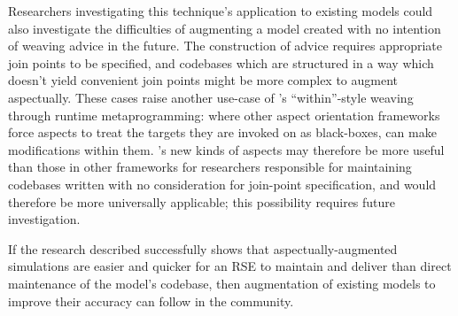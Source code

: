 Researchers investigating this technique's application to existing models could
also investigate the difficulties of augmenting a model created with no
intention of weaving advice in the future. The construction of advice requires
appropriate join points to be specified, and codebases which are structured in a
way which doesn't yield convenient join points might be more complex to augment
aspectually. These cases raise another use-case of \pdsf{}'s ``within''-style
weaving through runtime metaprogramming: where other aspect orientation
frameworks force aspects to treat the targets they are invoked on as
black-boxes, \pdsf can make modifications within them. \pdsf{}'s new kinds of
aspects may therefore be more useful than those in other frameworks for
researchers responsible for maintaining codebases written with no consideration
for join-point specification, and would therefore be more universally
applicable; this possibility requires future investigation.

If the research described successfully shows that aspectually-augmented
simulations are easier and quicker for an RSE to maintain and deliver than
direct maintenance of the model's codebase, then augmentation of existing models
to improve their accuracy can follow in the community. 
    



